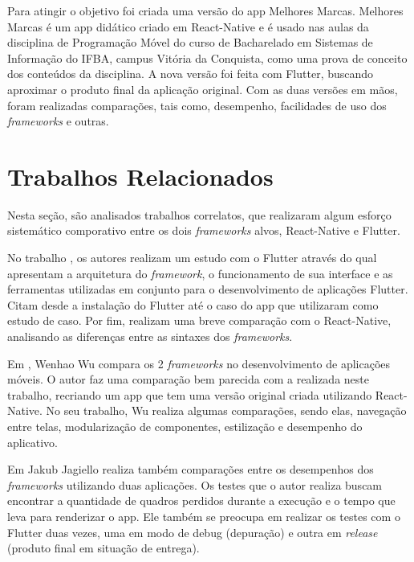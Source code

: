 \documentclass[12pt]{article}
\begin{document}
Para atingir o objetivo foi criada uma versão do app Melhores Marcas. Melhores Marcas é um app didático criado em React-Native e é usado nas aulas da disciplina de Programação Móvel do curso de Bacharelado em Sistemas de Informação do IFBA, campus Vitória da Conquista, como uma prova de conceito dos conteúdos da disciplina. A nova versão foi feita com Flutter, buscando aproximar o produto final da aplicação original. Com as duas versões em mãos, foram realizadas comparações, tais como, desempenho, facilidades de uso dos \textit{frameworks} e outras.

\section{Trabalhos Relacionados} \label{sec:Relacionados}
Nesta seção, são analisados trabalhos correlatos, que realizaram algum esforço sistemático comporativo entre os dois \textit{frameworks} alvos, React-Native e Flutter.

No trabalho \cite{ref_10}, os autores realizam um estudo com o Flutter através do qual apresentam a arquitetura do \textit{framework}, o funcionamento de sua interface e as ferramentas utilizadas em conjunto para o desenvolvimento de aplicações Flutter. Citam desde a instalação do Flutter até o caso do app que utilizaram como estudo de caso. Por fim, realizam uma breve comparação com o React-Native, analisando as diferenças entre as sintaxes dos \textit{frameworks}.

Em \cite{ref_6}, Wenhao Wu compara os 2 \textit{frameworks} no desenvolvimento de aplicações móveis. O autor faz uma comparação bem parecida com a realizada neste trabalho, recriando um app que tem uma versão original criada utilizando React-Native. No seu trabalho, Wu realiza algumas comparações, sendo elas, navegação entre telas, modularização de componentes, estilização e desempenho do aplicativo.

Em \cite{ref_7} Jakub Jagiello realiza também comparações entre os desempenhos dos \textit{frameworks} utilizando duas aplicações. Os testes que o autor realiza buscam encontrar a quantidade de quadros perdidos durante a execução e o tempo que leva para renderizar o app. Ele também se preocupa em realizar os testes com o Flutter duas vezes, uma em modo de debug (depuração) e outra em \textit{release} (produto final em situação de entrega).
\end{document}
